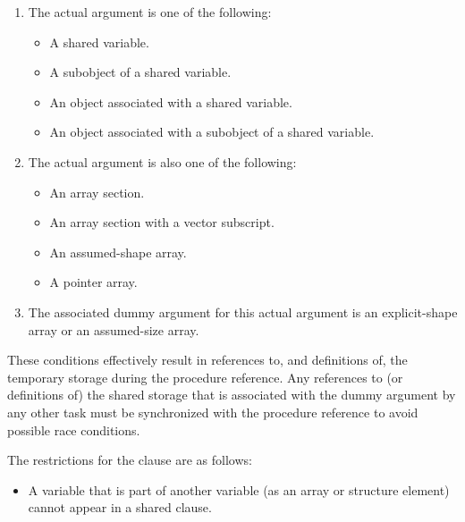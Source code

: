 \begin{enumerate}[label=\alph*] %
\item The actual argument is one of the following:

\begin{itemize} %
\item A shared variable.

\item A subobject of a shared variable.

\item An object associated with a shared variable.

\item An object associated with a subobject of a shared variable.
\end{itemize} %

\item The actual argument is also one of the following:

\begin{itemize} %
\item An array section.

\item An array section with a vector subscript.

\item An assumed-shape array.

\item A pointer array.
\end{itemize} %

\item The associated dummy argument for this actual argument is an explicit-shape array 
or an assumed-size array.
\end{enumerate}

\begin{samepage}
These conditions effectively result in references to, and definitions of, the temporary 
storage during the procedure reference. Any references to (or definitions of) the shared 
storage that is associated with the dummy argument by any other task must be 
synchronized with the procedure reference to avoid possible race conditions. 
\noteend
\medskip
\fortranspecificend
\end{samepage}

\restrictions
The restrictions for the  clause are as follows:
\begin{itemize}
\item A variable that is part of another variable (as an array or structure element) cannot appear in a shared clause.
\end{itemize}







